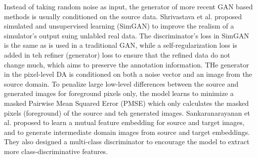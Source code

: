 \documentclass[conference]{IEEEtran}
\begin{document}
 Instead of taking random noise as input, the generator of more recent 
 GAN based methods is usually conditioned on the source data.
 Shrivastava et al. proposed simulated and unsupervised learning (SimGAN)
 to improve the realism of a simulator's output suing unlabled real data.
 The discriminator's loss in SimGAN is the same as is used in a traditional GAN,
 while a self-regularization loss is added in teh refiner (generator) loss 
 to ensure that the refined data do not change much, which aims to preserve
 the annotation information. 
 THe generator in the pixel-level DA is conditioned on both a noise vector
 and an image from the source domain. 
 To penalize large low-level differences between the source and generated images
 for foreground pixels only, the model learns to minimize a masked Pairwise Mean Squared Error (PMSE)
 which only calculates the masked pixels (foreground) of the source and 
 teh generated images. 
 Sankaranarayanan et al. proposed to learn a mutual feature embedding for source 
 and target images, and to generate intermediate domain images from source and 
 target embeddings. 
 They also designed a multi-class discriminator to encourage the model to 
 extract more class-discriminative features.
\end{document}
